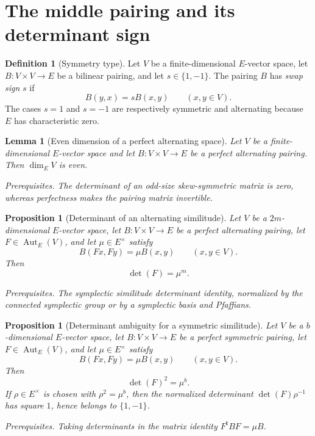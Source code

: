\documentclass[10pt]{article}
\newtheorem{proposition}[theorem]{Proposition}
\newtheorem{lemma}[theorem]{Lemma}
\theoremstyle{definition}
\newtheorem{definition}[theorem]{Definition}
\newcommand{\deps}[1]{\par\smallskip\noindent\textit{Prerequisites.} #1}
\begin{document}
\section{The middle pairing and its determinant sign}

\begin{definition}[Symmetry type]
Let \(V\) be a finite-dimensional \(E\)-vector space, let
\(B:V\times V\to E\) be a bilinear pairing, and let
\(s\in\{1,-1\}\).  The pairing \(B\) has \emph{swap sign} \(s\) if
\[
 B(y,x)=sB(x,y)
 \qquad(x,y\in V).
\]
The cases \(s=1\) and \(s=-1\) are respectively symmetric and alternating
because \(E\) has characteristic zero.
\end{definition}

\begin{lemma}[Even dimension of a perfect alternating space]
Let \(V\) be a finite-dimensional \(E\)-vector space and let
\(B:V\times V\to E\) be a perfect alternating pairing.  Then
\(\dim_EV\) is even.
\deps{The determinant of an odd-size skew-symmetric matrix is zero, whereas
perfectness makes the pairing matrix invertible.}
\end{lemma}

\begin{proposition}[Determinant of an alternating similitude]
Let \(V\) be a \(2m\)-dimensional \(E\)-vector space, let
\(B:V\times V\to E\) be a perfect alternating pairing, let
\(F\in\operatorname{Aut}_E(V)\), and let \(\mu\in E^\times\) satisfy
\[
                         B(Fx,Fy)=\mu B(x,y)
                         \qquad(x,y\in V).
\]
Then
\[
 \det(F)=\mu^m.
\]
\deps{The symplectic similitude determinant identity, normalized by the
connected symplectic group or by a symplectic basis and Pfaffians.}
\end{proposition}

\begin{proposition}[Determinant ambiguity for a symmetric similitude]
Let \(V\) be a \(b\)-dimensional \(E\)-vector space, let
\(B:V\times V\to E\) be a perfect symmetric pairing, let
\(F\in\operatorname{Aut}_E(V)\), and let \(\mu\in E^\times\) satisfy
\[
                         B(Fx,Fy)=\mu B(x,y)
                         \qquad(x,y\in V).
\]
Then
\[
 \det(F)^2=\mu^b.
\]
If \(\rho\in E^\times\) is chosen with \(\rho^2=\mu^b\), then the normalized
determinant \(\det(F)\rho^{-1}\) has square \(1\), hence belongs to
\(\{1,-1\}\).
\deps{Taking determinants in the matrix identity
\(F^{\mathsf t}BF=\mu B\).}
\end{proposition}
\end{document}
